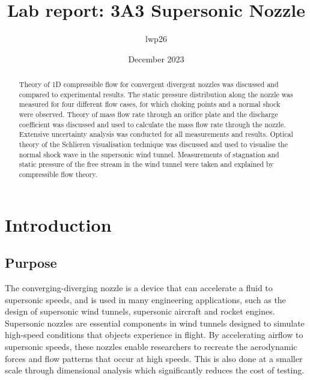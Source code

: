 \documentclass{article}
\begin{document}

\title{Lab report: 3A3 Supersonic Nozzle}
\author{lwp26}
\date{December 2023}
\maketitle

\begin{abstract}
    \centering
    Theory of 1D compressible flow for convergent divergent nozzles was discussed and compared to experimental results.
    The static pressure distribution along the nozzle was measured for four different flow cases, for which choking points and a normal shock were observed.
    Theory of mass flow rate through an orifice plate and the discharge coefficient was discussed and used to calculate the mass flow rate through the nozzle.
    Extensive uncertainty analysis was conducted for all measurements and results.
    Optical theory of the Schlieren visualisation technique was discussed and used to visualise the normal shock wave in the supersonic wind tunnel.
    Measurements of stagnation and static pressure of the free stream in the wind tunnel were taken and explained by compressible flow theory.
\end{abstract}

\newpage

\section{Introduction}

\subsection{Purpose}
The converging-diverging nozzle is a device that can accelerate a fluid to supersonic speeds, and is used in many engineering applications, such as the design of supersonic wind tunnels, supersonic aircraft and rocket engines.
Supersonic nozzles are essential components in wind tunnels designed to simulate high-speed conditions that objects experience in flight.
By accelerating airflow to supersonic speeds, these nozzles enable researchers to recreate the aerodynamic forces and flow patterns that occur at high speeds.
This is also done at a smaller scale through dimensional analysis which significantly reduces the cost of testing.
\end{document}
